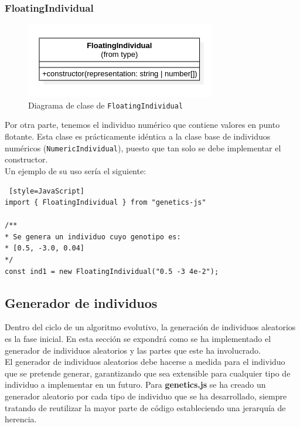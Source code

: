 \subsubsection{FloatingIndividual}

\begin{figure}[ht]
    \centering
    \includegraphics[scale=0.7]{mem/images/cap-4/4.2.2(Individuos)/FloatingIndividual.png}
    \caption{Diagrama de clase de \texttt{FloatingIndividual}}
    \label{fig:binaryindividual-uml}
\end{figure}

Por otra parte, tenemos el individuo numérico que contiene valores en punto flotante. Esta clase es prácticamente idéntica a la clase base de individuos numéricos (\texttt{NumericIndividual}), puesto que tan solo se debe implementar el constructor. \\

Un ejemplo de su uso sería el siguiente: \\

\begin{lstlisting} [style=JavaScript]
import { FloatingIndividual } from "genetics-js"

/**
* Se genera un individuo cuyo genotipo es:
* [0.5, -3.0, 0.04]
*/
const ind1 = new FloatingIndividual("0.5 -3 4e-2");
\end{lstlisting}


\subsection{Generador de individuos}

Dentro del ciclo de un algoritmo evolutivo, la generación de individuos aleatorios es la fase inicial. En esta sección se expondrá como se ha implementado el generador de individuos aleatorios y las partes que este ha involucrado. \\

El generador de individuos aleatorios debe hacerse a medida para el individuo que se pretende generar, garantizando que sea extensible para cualquier tipo de individuo a implementar en un futuro. Para \textbf{genetics.js} se ha creado un generador aleatorio por cada tipo de individuo que se ha desarrollado, siempre tratando de reutilizar la mayor parte de código estableciendo una jerarquía de herencia.

